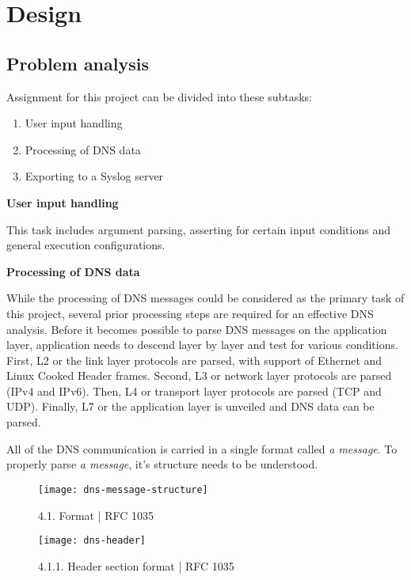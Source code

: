\section{Design}

\subsection{Problem analysis}

Assignment for this project can be divided into these subtasks:
\begin{enumerate}
\item User input handling
\item Processing of DNS data
\item Exporting to a Syslog server
\end{enumerate}

\vspace{0.5cm}
\textbf{User input handling}

This task includes argument parsing, asserting for certain input conditions and general execution configurations.

\vspace{0.5cm}
\textbf{Processing of DNS data}

While the processing of DNS messages could be considered as the primary task of this project, several prior processing steps are required for an effective DNS analysis.
Before it becomes possible to parse DNS messages on the application layer, application needs to descend layer by layer and test for various conditions.
First, L2 or the link layer protocols are parsed, with support of Ethernet and Linux Cooked Header frames. Second, L3 or network layer protocols are parsed (IPv4 and IPv6).
Then, L4 or transport layer protocols are parsed (TCP and UDP). Finally, L7 or the application layer is unveiled and DNS data can be parsed.

\vspace{0.5cm}
All of the DNS communication is carried in a single format called \textit{a message}.
To properly parse \textit{a message}, it's structure needs to be understood.

\begin{figure}[h]
\texttt{[image: dns-message-structure]}
\centering
\caption{4.1. Format | RFC 1035}
\end{figure}

\pagebreak

\begin{figure}[h]
\texttt{[image: dns-header]}
\centering
\caption{4.1.1. Header section format | RFC 1035}
\end{figure}

